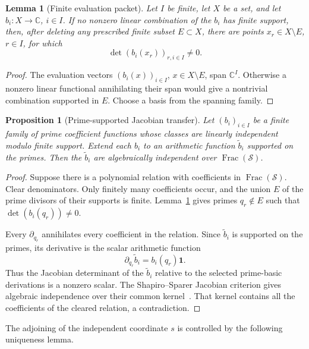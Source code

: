 \documentclass[11pt]{article}
\newtheorem{proposition}[theorem]{Proposition}
\newtheorem{lemma}[theorem]{Lemma}
\theoremstyle{definition}
\theoremstyle{remark}
\newcommand{\C}{\mathbb C}
\newcommand{\Frac}{\operatorname{Frac}}
\begin{document}
\begin{lemma}[Finite evaluation packet]\label{lem:evaluation-packet}
Let \(I\) be finite, let \(X\) be a set, and let \(b_i:X\to\C\), \(i\in I\).  If no
nonzero linear combination of the \(b_i\) has finite support, then, after deleting any prescribed
finite subset \(E\subset X\), there are points \(x_r\in X\setminus E\), \(r\in I\), for
which
\[
  \det(b_i(x_r))_{r,i\in I}\neq0.
\]
\end{lemma}

\begin{proof}
The evaluation vectors \((b_i(x))_{i\in I}\), \(x\in X\setminus E\), span \(\C^I\).
Otherwise a nonzero linear functional annihilating their span would give a nontrivial combination
supported in \(E\).  Choose a basis from the spanning family.
\end{proof}

\begin{proposition}[Prime-supported Jacobian transfer]\label{prop:jacobian-transfer}
Let \((b_i)_{i\in I}\) be a finite family of prime coefficient functions whose classes are
linearly independent modulo finite support.  Extend each \(b_i\) to an arithmetic function
\(\widetilde b_i\) supported on the primes.  Then the \(\widetilde b_i\) are algebraically
independent over \(\Frac(\mathscr S)\).
\end{proposition}

\begin{proof}
Suppose there is a polynomial relation with coefficients in \(\Frac(\mathscr S)\).  Clear
denominators.  Only finitely many coefficients occur, and the union \(E\) of the prime divisors of
their supports is finite.  Lemma~\ref{lem:evaluation-packet} gives primes
\(q_r\notin E\) such that \(\det(b_i(q_r))\neq0\).

Every \(\partial_{q_r}\) annihilates every coefficient in the relation.  Since
\(\widetilde b_i\) is supported on the primes, its derivative is the scalar arithmetic function
\[
  \partial_{q_r}\widetilde b_i=b_i(q_r)\mathbf 1.
\]
Thus the Jacobian determinant of the \(\widetilde b_i\) relative to the selected prime-basic
derivations is a nonzero scalar.  The Shapiro--Sparer Jacobian criterion gives algebraic
independence over their common
kernel~\cite{ShapiroSparer1986}.  That kernel contains all the coefficients of the cleared
relation, a contradiction.
\end{proof}

The adjoining of the independent coordinate \(s\) is controlled by the following uniqueness
lemma.
\end{document}
